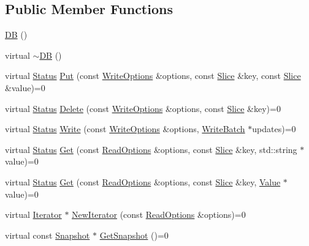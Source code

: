 \subsection*{Public Member Functions}
\begin{DoxyCompactItemize}
\item 
\hyperlink{classleveldb_1_1_d_b_a6b275339ff6194c598daf7091ad8d5c1}{D\+B} ()
\item 
virtual \hyperlink{classleveldb_1_1_d_b_a15f516eb9ec41812419a7160b4740a22}{$\sim$\+D\+B} ()
\item 
virtual \hyperlink{classleveldb_1_1_status}{Status} \hyperlink{classleveldb_1_1_d_b_ac2e472812630ed74298df7b03b08c1ae}{Put} (const \hyperlink{structleveldb_1_1_write_options}{Write\+Options} \&options, const \hyperlink{classleveldb_1_1_slice}{Slice} \&key, const \hyperlink{classleveldb_1_1_slice}{Slice} \&value)=0
\item 
virtual \hyperlink{classleveldb_1_1_status}{Status} \hyperlink{classleveldb_1_1_d_b_aff7577239799cd059464701c548090b9}{Delete} (const \hyperlink{structleveldb_1_1_write_options}{Write\+Options} \&options, const \hyperlink{classleveldb_1_1_slice}{Slice} \&key)=0
\item 
virtual \hyperlink{classleveldb_1_1_status}{Status} \hyperlink{classleveldb_1_1_d_b_ae0b6ded8c8e0b88ff70190bf7a0c086c}{Write} (const \hyperlink{structleveldb_1_1_write_options}{Write\+Options} \&options, \hyperlink{classleveldb_1_1_write_batch}{Write\+Batch} $\ast$updates)=0
\item 
virtual \hyperlink{classleveldb_1_1_status}{Status} \hyperlink{classleveldb_1_1_d_b_ad43bd7937b9af88ff856eb8158890911}{Get} (const \hyperlink{structleveldb_1_1_read_options}{Read\+Options} \&options, const \hyperlink{classleveldb_1_1_slice}{Slice} \&key, std\+::string $\ast$value)=0
\item 
virtual \hyperlink{classleveldb_1_1_status}{Status} \hyperlink{classleveldb_1_1_d_b_aab72bf4d8289d6afcf6020b31e7de335}{Get} (const \hyperlink{structleveldb_1_1_read_options}{Read\+Options} \&options, const \hyperlink{classleveldb_1_1_slice}{Slice} \&key, \hyperlink{classleveldb_1_1_value}{Value} $\ast$value)=0
\item 
virtual \hyperlink{classleveldb_1_1_iterator}{Iterator} $\ast$ \hyperlink{classleveldb_1_1_d_b_a5629308235de24c05c286c353d4e7d32}{New\+Iterator} (const \hyperlink{structleveldb_1_1_read_options}{Read\+Options} \&options)=0
\item 
virtual const \hyperlink{classleveldb_1_1_snapshot}{Snapshot} $\ast$ \hyperlink{classleveldb_1_1_d_b_a7d13f6336c7c5f0bf79578d57c45568c}{Get\+Snapshot} ()=0

\end{DoxyCompactItemize}
